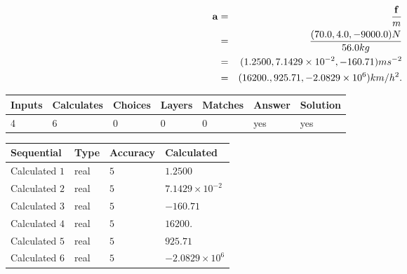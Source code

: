 \documentclass[12pt]{article}
\begin{document}
\begin{eqnarray*}
\mathbf{a}&=&\frac{\mathbf{f}}m  \\
&=&\frac{(
70.0 ,
4.0 ,
-9000.0 )N
}{ %
56.0 kg}  \\
&=&(
1.2500 ,
7.1429 \times 10^{-2},
-160.71
)ms^{-2} \\
&=&(
16200. ,
925.71 ,
-2.0829 \times 10^{6}
)km/h^2.
\end{eqnarray*}
 
 
 
\noindent{}
 
 

 
\vspace{0.3in}
   
   
   
   
\noindent\begin{tabular}{|l|l|l|l|l|l|l|}
 \hline
Inputs & Calculates & Choices & Layers & Matches & Answer & Solution \\ \hline
           4 & 
           6 & 
           0
  & 
           0 & 
           0 & 
  yes & 
  yes 
  \\ \hline
 \end{tabular}
   
   
   
   
\noindent{}
   
   
  
  
\noindent\begin{tabular}{|l|l|l|l|}
\hline
 Sequential & Type & Accuracy & Calculated \\ 
\hline
 
 
  Calculated $           1$ & real & $           5 $ & 
 $ 1.2500 $ 
 \\  \hline  
 
 
  Calculated $           2$ & real & $           5 $ & 
 $ 7.1429 \times 10^{-2} $ 
 \\  \hline  
 
 
  Calculated $           3$ & real & $           5 $ & 
 $ -160.71 $ 
 \\  \hline  
 
 
  Calculated $           4$ & real & $           5 $ & 
 $ 16200. $ 
 \\  \hline  
 
 
  Calculated $           5$ & real & $           5 $ & 
 $ 925.71 $ 
 \\  \hline  
 
 
  Calculated $           6$ & real & $           5 $ & 
 $ -2.0829 \times 10^{6} $ 
 \\  \hline  
 \end{tabular}
   
\end{document}
